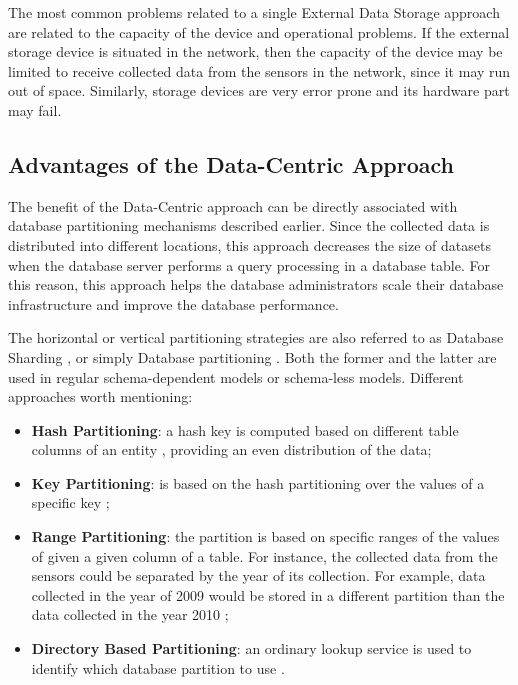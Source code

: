 The most common problems related to a single External Data Storage approach are
related to the capacity of the device and operational problems. If the
external storage device is situated in the network, then the capacity of the
device may be limited to receive collected data from the sensors in the
network, since it may run out of space. Similarly, storage devices are very
error prone and its hardware part may fail.

\subsection{Advantages of the Data-Centric Approach}

The benefit of the Data-Centric approach can be directly associated with
database partitioning mechanisms described earlier. Since the collected data is
distributed into different locations, this approach decreases the size of
datasets when the database server performs a query processing in a database
table. For this reason, this approach helps the database administrators scale
their database infrastructure and improve the database performance.

The horizontal or vertical partitioning strategies are also referred to as
Database Sharding \cite{db-shard-discussion}, or simply Database partitioning
\cite{db-partitioning-relational}. Both the former and the latter are used in
regular schema-dependent models or schema-less models. Different approaches
worth mentioning:

\begin{itemize}
  \item \textbf{Hash Partitioning}: a hash key is computed based on
  different table columns of an entity \cite{db-shard-schemas,
  db-partitioning-relational}, providing an even distribution of the data;
  \item \textbf{Key Partitioning}: is based on the hash partitioning over the
  values of a specific key \cite{db-mongo-partition};
  \item \textbf{Range Partitioning}: the partition is based on specific ranges
  of the values of given a given column of a table. For instance, the collected
  data from the sensors could be separated by the year of its collection. For
  example, data collected in the year of 2009 would be stored in a different
  partition than the data collected in the year 2010
  \cite{db-partitioning-relational};
  \item \textbf{Directory Based Partitioning}: an ordinary lookup service is
  used to identify which database partition to use \cite{db-shard-schemas}.
\end{itemize}

